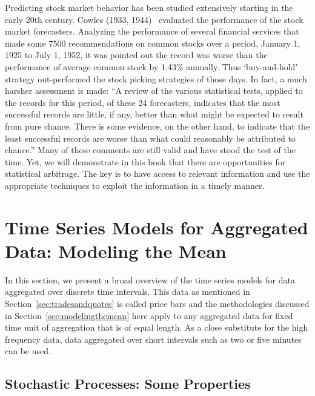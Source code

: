Predicting stock market behavior has been studied extensively starting in the early 20th century. Cowles (1933, 1944)~\cite{cow1,cow2} evaluated the performance of the stock market forecasters. Analyzing the performance of several financial services that made some 7500 recommendations on common stocks over a period, January 1, 1925 to July 1, 1952, it was pointed out the record was worse than the performance of average common stock by 1.43\% annually. Thus `buy-and-hold' strategy out-performed the stock picking strategies of those days. In fact, a much harsher assessment is made: ``A review of the various statistical tests, applied to the records for this period, of these 24 forecasters, indicates that the most successful records are little, if any, better than what might be expected to result from pure chance. There is some evidence, on the other hand, to indicate that the least successful records are worse than what could reasonably be attributed to chance.'' Many of these comments are still valid and have stood the test of the time. Yet, we will demonstrate in this book that there are opportunities for statistical arbitrage. The key is to have access to relevant information and use the appropriate techniques to exploit the information in a timely manner. 



\section{Time Series Models for Aggregated Data: Modeling the Mean \label{sec:modelingthemean}}

In this section, we present a broad overview of the time series models for data aggregated over discrete time intervals. This data as mentioned in Section~\ref{sec:tradesandquotes} is called price bars and the methodologies discussed in Section~\ref{sec:modelingthemean} here apply to any aggregated data for fixed time unit of aggregation that is of equal length. As a close substitute for the high frequency data, data aggregated over short intervals such as two or five minutes can be used.



\subsection{Stochastic Processes: Some Properties}


